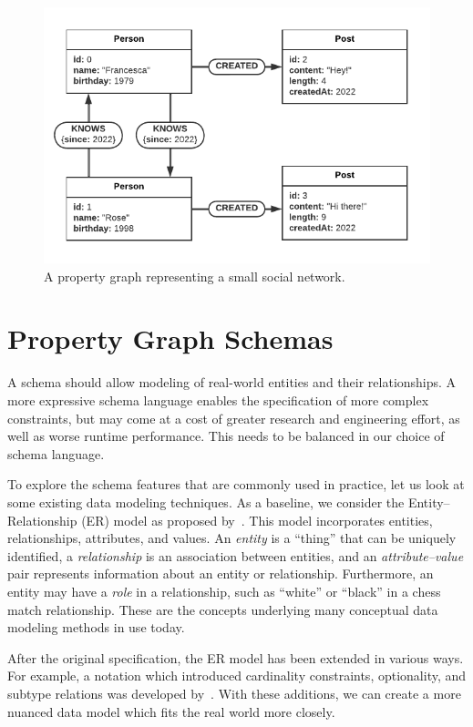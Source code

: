 \documentclass{report}
\theoremstyle{definition}
\begin{document}
\begin{figure}[t]
  \centering
  \includegraphics{figures/pg.pdf}
  \caption{A property graph representing a small social network.}
  \label{fig:pg}
\end{figure}

\chapter{Property Graph Schemas}
\label{ch:pg-schema}

A schema should allow modeling of real-world entities and their relationships. A more expressive schema language enables the specification of more complex constraints, but may come at a cost of greater research and engineering effort, as well as worse runtime performance. This needs to be balanced in our choice of schema language.

To explore the schema features that are commonly used in practice, let us look at some existing data modeling techniques. As a baseline, we consider the Entity--Relationship (ER) model as proposed by~\citet{chen1976entity}. This model incorporates entities, relationships, attributes, and values. An \emph{entity} is a ``thing'' that can be uniquely identified, a \emph{relationship} is an association between entities, and an \emph{attribute--value} pair represents information about an entity or relationship. Furthermore, an entity may have a \emph{role} in a relationship, such as ``white'' or ``black'' in a chess match relationship. These are the concepts underlying many conceptual data modeling methods in use today.

After the original specification, the ER model has been extended in various ways. For example, a notation which introduced cardinality constraints, optionality, and subtype relations was developed by~\citet{barker1990entity}. With these additions, we can create a more nuanced data model which fits the real world more closely.
\end{document}
